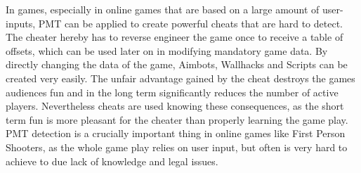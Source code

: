 In games, especially in online games that are based on a large amount of user-inputs, PMT can be applied to create powerful cheats that are hard to detect. The cheater hereby has to reverse engineer the game once to receive a table of offsets, which can be used later on in modifying mandatory game data. By directly changing the data of the game, Aimbots, Wallhacks and Scripts can be created very easily. The unfair advantage gained by the cheat destroys the games audiences fun and in the long term significantly reduces the number of active players. Nevertheless cheats are used knowing these consequences, as the short term fun is more pleasant for the cheater than properly learning the game play. PMT detection is a crucially important thing in online games like First Person Shooters, as the whole game play relies on user input, but often is very hard to achieve to due lack of knowledge and legal issues.